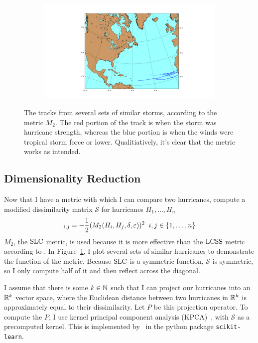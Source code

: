 \begin{figure}
\begin{subfigure}[t]{0.45\textwidth}
	\end{subfigure}
	\begin{subfigure}[t]{0.45\textwidth}
		\centering
		\includegraphics[width=\linewidth, trim=350 50 300 50, clip]{images/similar_hurricanes_4.png}
	\end{subfigure}
	\caption{The tracks from several sets of similar storms, according to the metric $M_{2}$. The red portion of the track is when the storm was hurricane strength, whereas the blue portion is when the winds were tropical storm force or lower. Qualitiatively, it's clear that the metric works as intended.}
	\label{fig:similar_hurricanes}
\end{figure}

\subsection{Dimensionality Reduction}

\par
Now that I have a metric with which I can compare two hurricanes, compute a modified dissimilarity matrix $\mathcal{S}$ for hurricanes $H_{1},\ldots,H_{n}$
\begin{equation}
	[\mathcal{S}]_{i,j}=-\frac{1}{2}(M_{2}(H_{i},H_{j},\delta,\varepsilon))^{2}\;\;i,j\in\set{1,\ldots,n}
	\label{eq:dissimilarity}
\end{equation}
$M_{2}$, the $\operatorname{SLC}$ metric, is used because it is more effective than the $\operatorname{LCSS}$ metric according to \cite{ho2015manifold}.
In Figure~\ref{fig:similar_hurricanes}, I plot several sets of similar hurricanes to demonstrate the function of the metric.
Because $\operatorname{SLC}$ is a symmetric function, $\mathcal{S}$ is symmetric, so I only compute half of it and then reflect across the diagonal.

\par
I assume that there is some $k\in\mathbb{N}$ such that I can project our hurricanes into an $\mathbb{R}^{k}$ vector space, where the Euclidean distance between two hurricanes in $\mathbb{R}^{k}$ is approximately equal to their dissimilarity.
Let $P$ be this projection operator.
To compute the $P$, I use kernel principal component analysis (KPCA)~\cite{scholkopf1997kernel}, with $\mathcal{S}$ as a precomputed kernel.
This is implemented by~\cite{scikit-learn} in the python package \texttt{scikit-learn}.

